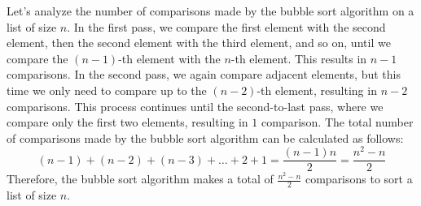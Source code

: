 \begin{eg}
    Let's analyze the number of comparisons made by the bubble sort algorithm on a list of size $n$. In the first pass, we compare the first element with the second element, then the second element with the third element, and so on, until we compare the $(n-1)$-th element with the $n$-th element. This results in $n-1$ comparisons. In the second pass, we again compare adjacent elements, but this time we only need to compare up to the $(n-2)$-th element, resulting in $n-2$ comparisons. This process continues until the second-to-last pass, where we compare only the first two elements, resulting in $1$ comparison. The total number of comparisons made by the bubble sort algorithm can be calculated as follows:
    \[(n-1) + (n-2) + (n-3) + \ldots + 2 + 1 = \frac{(n-1)n}{2} = \frac{n^2 - n}{2}\]
    Therefore, the bubble sort algorithm makes a total of $\frac{n^2 - n}{2}$ comparisons to sort a list of size $n$.
\end{eg}